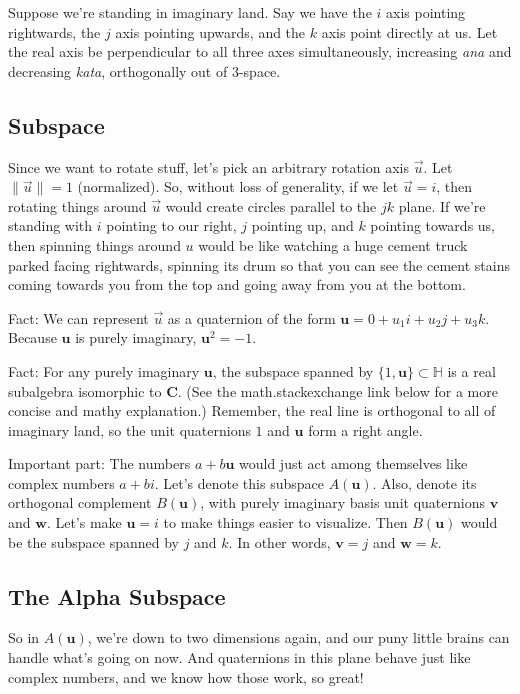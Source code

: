 \documentclass[12pt]{article}
\begin{document}
	Suppose we're standing in imaginary land. 
	Say we have the $i$ axis pointing rightwards, the $j$ axis pointing upwards, and the $k$ axis point directly at us. 
	Let the real axis be perpendicular to all three axes simultaneously, increasing \textit{ana} and decreasing \textit{kata}, orthogonally out of 3-space.
	
	\subsection{Subspace}
	
	Since we want to rotate stuff, let's pick an arbitrary rotation axis $\vec{u}$. 
	Let $\|\vec{u}\| = 1$ (normalized). 
	So, without loss of generality, if we let $\vec{u} = i$, then rotating things around $\vec{u}$ would create circles parallel to the $jk$ plane. 
	If we're standing with $i$ pointing to our right, $j$ pointing up, and $k$ pointing towards us, then spinning things around $u$ would be like watching a huge cement truck parked facing rightwards, spinning its drum so that you can see the cement stains coming towards you from the top and going away from you at the bottom.
	
	Fact: We can represent $\vec{u}$ as a quaternion of the form $\mathbf{u} = 0 + u_1i + u_2j + u_3k$. 
	Because $\mathbf{u}$ is purely imaginary, $\mathbf{u}^2 = -1$.
	
	Fact: For any purely imaginary $\mathbf{u}$, the subspace spanned by $\{1, \mathbf{u}\} \subset \mathbb{H}$ is a real subalgebra isomorphic to $\mathbf{C}$. 
	(See the math.stackexchange link below for a more concise and mathy explanation.) 
	Remember, the real line is orthogonal to all of imaginary land, so the unit quaternions $1$ and $\mathbf{u}$ form a right angle. 
	
	Important part: The numbers $a + b\mathbf{u}$ would just act among themselves like complex numbers $a + bi$. 
	Let's denote this subspace $A(\mathbf{u})$. 
	Also, denote its orthogonal complement $B(\mathbf{u})$, with purely imaginary basis unit quaternions $\mathbf{v}$ and $\mathbf{w}$. 
	Let's make $\mathbf{u} = i$ to make things easier to visualize. 
	Then $B(\mathbf{u})$ would be the subspace spanned by $j$ and $k$. 
	In other words, $\mathbf{v} = j$ and $\mathbf{w} = k$.
	
	\subsection{The Alpha Subspace}
	
	So in $A(\mathbf{u})$, we're down to two dimensions again, and our puny little brains can handle what's going on now. 
	And quaternions in this plane behave just like complex numbers, and we know how those work, so great!
	
\end{document}
